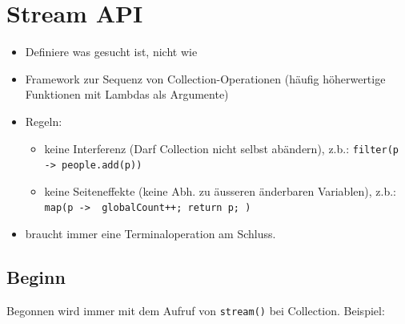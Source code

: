 \section*{Stream API}
	\begin{itemize}[noitemsep]
		\item Definiere was gesucht ist, nicht wie
		\item Framework zur Sequenz von Collection-Operationen (häufig höherwertige Funktionen mit Lambdas als Argumente)
		\item Regeln:
		\begin{itemize}[noitemsep]
			\item keine Interferenz (Darf Collection nicht selbst abändern), z.b.: \texttt{filter(p -> people.add(p))}
			\item keine Seiteneffekte (keine Abh. zu äusseren änderbaren Variablen), z.b.: \texttt{map(p -> { globalCount++; return p; })}
		\end{itemize}
		\item braucht immer eine Terminaloperation am Schluss.
	\end{itemize}
	\subsection*{Beginn}
		Begonnen wird immer mit dem Aufruf von \texttt{stream()} bei Collection. Beispiel:
		
